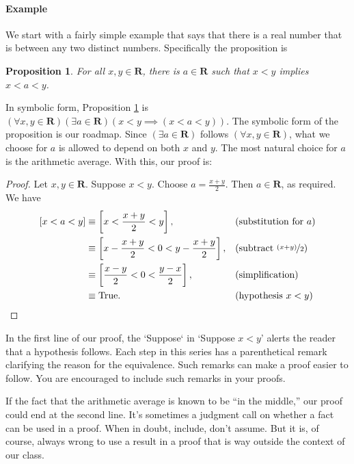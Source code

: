 \documentclass[12pt,fleqn]{article}
\newcommand{\reals}{\mathbf{R}}
\newcommand{\true}{\mathrm{True}}
\newenvironment{myproof}
  {\begin{shaded}\begin{proof}}
  {\end{proof}\end{shaded}}
\newtheorem{prop}{Proposition}
\newcounter{ex}\setcounter{ex}{0}
\newcommand{\ex}{%
\setcounter{ex}{\value{ex}+1}
\paragraph{Example \theex}}
\begin{document}
\ex We start with a fairly simple example that says that there is a 
real number that is between any two distinct numbers. Specifically
the proposition is
\begin{prop}
  For all $x,y \in \reals$, there is $a \in \reals$ such that
    $x < y$ implies $x<a<y$. \label{p1}   
\end{prop}
In symbolic form, Proposition \ref{p1} is
$\left(\forall x,y \in \reals \right) 
 \left( \exists a \in \reals \right)
\left(  x < y \implies \left(x < a < y \right) \right)$.  The symbolic form 
of the proposition is our roadmap. Since $\left(\exists a \in \reals \right)$ follows 
$\left(\forall x,y \in \reals \right)$, what we choose for $a$ is allowed to 
depend on both $x$ and $y$. The most natural choice for $a$ is the
arithmetic average. With this, our proof is:
\begin{myproof}
    Let $x,y \in \reals$. Suppose $x < y$. Choose $a = \frac{x+y}{2}$.
    Then $a \in \reals$, as required. We have
    \begin{align*}
      \left[ x < a < y \right] 
          &\equiv \left[ x < \frac{x+y}{2} < y \right], &&\text{(substitution for $a$)} \\
          & \equiv \left[ x - \frac{x+y}{2} < 0 < y - \frac{x+y}{2}  \right], &&\text{(subtract $\nicefrac{(x+y)}{2}$)} \\
          & \equiv \left[ \frac{x-y}{2} < 0 < \frac{y-x}{2}  \right], &&\text{(simplification)} \\
          & \equiv \true. && \text{(hypothesis $x < y$)} \qedhere
    \end{align*} 
\end{myproof}
In the first line of our proof, the `Suppose` in  `Suppose $x < y$' alerts the reader that a hypothesis follows.
Each step in this series has a parenthetical remark clarifying the reason for the equivalence. 
Such remarks can make a proof easier to follow. You are encouraged
to include such remarks in your proofs.

If the fact that the arithmetic average is known to be ``in the middle,'' our proof could end at 
the second line. It's sometimes a judgment call on whether a fact can be used in a proof. When in doubt, include, don't assume.
But it is, of course, always wrong to use a result in a proof  that is way outside the context of our class.
\end{document}
